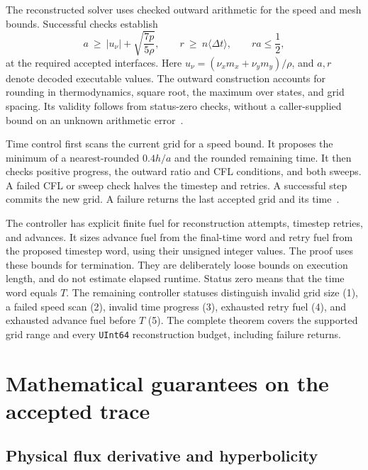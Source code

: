 \documentclass[11pt]{article}
\newcommand{\code}[1]{\texttt{#1}}
\newcommand{\val}[1]{\langle #1\rangle}
\begin{document}
The reconstructed solver uses checked outward arithmetic for the speed and mesh bounds.  Successful checks establish
\begin{equation}
a\ \geq\ |u_\nu|+\sqrt{\frac{7p}{5\rho}},\qquad
r\ \geq\ n\val{\Delta t},\qquad ra\leq\frac12,\label{eq:cfl}
\end{equation}
at the required accepted interfaces.  Here $u_\nu=(\nu_xm_x+\nu_ym_y)/\rho$, and $a,r$ denote decoded executable values.  The outward construction accounts for rounding in thermodynamics, square root, the maximum over states, and grid spacing.  Its validity follows from status-zero checks, without a caller-supplied bound on an unknown arithmetic error~\cite{outward}.

Time control first scans the current grid for a speed bound.  It proposes the minimum of a nearest-rounded $0.4h/a$ and the rounded remaining time.  It then checks positive progress, the outward ratio and CFL conditions, and both sweeps.  A failed CFL or sweep check halves the timestep and retries.  A successful step commits the new grid.  A failure returns the last accepted grid and its time~\cite{control}.

The controller has explicit finite fuel for reconstruction attempts, timestep retries, and advances.  It sizes advance fuel from the final-time word and retry fuel from the proposed timestep word, using their unsigned integer values.  The proof uses these bounds for termination.  They are deliberately loose bounds on execution length, and do not estimate elapsed runtime.  Status zero means that the time word equals $T$.  The remaining controller statuses distinguish invalid grid size (1), a failed speed scan (2), invalid time progress (3), exhausted retry fuel (4), and exhausted advance fuel before $T$ (5).  The complete theorem covers the supported grid range and every \code{UInt64} reconstruction budget, including failure returns.

\section{Mathematical guarantees on the accepted trace}

\subsection{Physical flux derivative and hyperbolicity}
\end{document}
